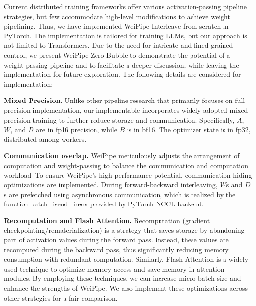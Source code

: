 \documentclass[sigplan,review]{acmart}
\begin{document}
Current distributed training frameworks offer various activation-passing pipeline strategies, but few accommodate high-level modifications to achieve weight pipelining. Thus, we have implemented WeiPipe-Interleave from scratch in PyTorch\cite{pytorch}. The implementation is tailored for training LLMs, but our approach is not limited to Transformers. Due to the need for intricate and fined-grained control, we present WeiPipe-Zero-Bubble to demonstrate the potential of a weight-passing pipeline and to facilitate a deeper discussion, while leaving the implementation for future exploration. The following details are considered for implementation:

\textbf{Mixed Precision.} Unlike other pipeline research that primarily focuses on full precision implementation, our implementable incorporates widely adopted mixed precision training to further reduce storage and communication. Specifically, $A$, $W$, and $D$ are in fp16 precision, while $B$ is in bf16. The optimizer state is in fp32, distributed among workers.




\textbf{Communication overlap.} WeiPipe meticulously adjusts the arrangement of computation and weight-passing to balance the communication and computation workload. To ensure WeiPipe's high-performance potential, communication hiding optimizations are implemented. During forward-backward interleaving, $W$s and $D$s are prefetched using asynchronous communication, which is realized by the function batch\_isend\_irecv provided by PyTorch NCCL backend.

\textbf{Recomputation and Flash Attention.} Recomputation (gradient checkpointing/rematerialization) is a strategy that saves storage by abandoning part of activation values during the forward pass. Instead, these values are recomputed during the backward pass, thus significantly reducing memory consumption with redundant computation. Similarly, Flash Attention\cite{dao2022flashattention} is a widely used technique to optimize memory access and save memory in attention modules. By employing these techniques, we can increase micro-batch size and enhance the strengths of WeiPipe. We also implement these optimizations across other strategies for a fair comparison.
\end{document}
